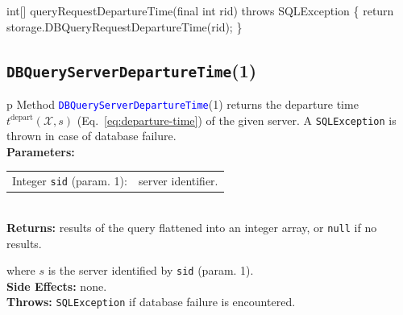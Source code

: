 \nwenddocs{}\endmoddef{}
int[] queryRequestDepartureTime(final int rid) throws SQLException \{
  return storage.DBQueryRequestDepartureTime(rid);
\}
\eatline
{}\nwendcode{}\nwdocspar
\subsection{\texttt{DBQueryServerDepartureTime}(1)}
\begin{tabular}{p{\textwidth}}
\toprule
{}
Method \textcolor{blue}{{\tt{}\protect{}DBQueryServerDepartureTime}}(1) returns the
departure time $t^\textrm{depart}(\mathcal{X},s)$
(Eq.~\ref{eq:departure-time}) of the given server.
A {\tt{}SQLException} is thrown in case of database failure.\\
\midrule
\textbf{Parameters:}\\
\begin{tabular}{lp{116mm}}
Integer {\tt{}sid} (param. 1):&server identifier.
\end{tabular}\\
\textbf{Returns:} results of the query flattened into an integer array,
or {\tt{}null} if no results.


where $s$ is the server identified by {\tt{}sid} (param. 1).\\
\textbf{Side Effects:} none.\\
\textbf{Throws:} {\tt{}SQLException} if database failure is encountered.\\
\bottomrule
\end{tabular}
